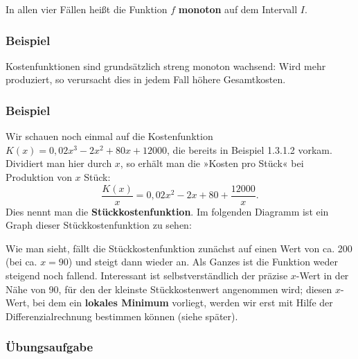 In allen vier Fällen heißt die Funktion $f$ \textbf{monoton} auf dem Intervall $I$.

\subsubsection{Beispiel}

Kostenfunktionen sind grundsätzlich streng monoton wachsend: Wird mehr produziert, so verursacht dies in jedem Fall höhere Gesamtkosten.\beispielende

\subsubsection{Beispiel}

Wir schauen noch einmal auf die Kostenfunktion $K(x) = 0{,}02 x^3 - 2 x^2 + 80 x + 12000$, die bereits in Beispiel 1.3.1.2 vorkam. Dividiert man hier durch $x$, so erhält man die »Kosten pro Stück« bei Produktion von $x$ Stück:
\[ \frac{K(x)}{x} = 0{,}02 x^2 - 2x + 80 + \frac{12000}{x} . \]
Dies nennt man die \textbf{Stückkostenfunktion}. Im folgenden Diagramm ist ein Graph dieser Stückkostenfunktion zu sehen:

\begin{center}
\end{center}

Wie man sieht, fällt die Stückkostenfunktion zunächst auf einen Wert von ca. 200 (bei ca. $x = 90$) und steigt dann wieder an. Als Ganzes ist die Funktion weder steigend noch fallend. Interessant ist selbstverständlich der präzise $x$-Wert in der Nähe von 90, für den der kleinste Stückkostenwert angenommen wird; diesen $x$-Wert, bei dem ein \textbf{lokales Minimum} vorliegt, werden wir erst mit Hilfe der Differenzialrechnung bestimmen können (siehe später).\beispielende

\subsubsection{Übungsaufgabe}

